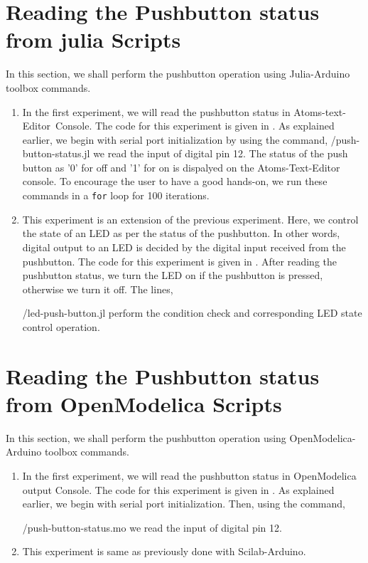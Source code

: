 \section{Reading the Pushbutton status from julia Scripts}
In this section, we shall perform the pushbutton operation using
Julia-Arduino toolbox commands.
\begin{enumerate}
\item In the first experiment, we will read the pushbutton status in
  Atoms-text-Editor\ Console. The code for this experiment is given in
  . As explained earlier, we begin with serial
  port initialization by using the command,
  {\LocPushjuliacode/push-button-status.jl} we read the input of
  digital pin 12. The status of the push button as '0' for off and
  '1' for on is dispalyed on the Atoms-Text-Editor console. To
  encourage the user to have a good hands-on, we run these commands in
  a {\tt for} loop for 100 iterations.

\item This experiment is an extension of the previous
  experiment. Here, we control the state of an LED as per the status
  of the pushbutton. In other words, digital output to an LED is
  decided by the digital input received from the pushbutton. The code
  for this experiment is given in . After reading
  the pushbutton status, we turn the LED on if the pushbutton is
  pressed, otherwise we turn it off. The lines,
  
  {\LocPushjuliacode/led-push-button.jl} perform the condition check
  and corresponding LED state control operation.
\end{enumerate}

\section{Reading the Pushbutton status from OpenModelica Scripts}
In this section, we shall perform the pushbutton operation using
OpenModelica-Arduino toolbox commands.
\begin{enumerate}
\item In the first experiment, we will read the pushbutton status in
  OpenModelica output Console. The code for this experiment is given in
  . As explained earlier, we begin with serial
  port initialization. Then, using the command,
  
  {\LocPushOpenModelicacode/push-button-status.mo} we read the input of
  digital pin 12. 
\item This experiment is same as previously done with Scilab-Arduino.
\end{enumerate}

